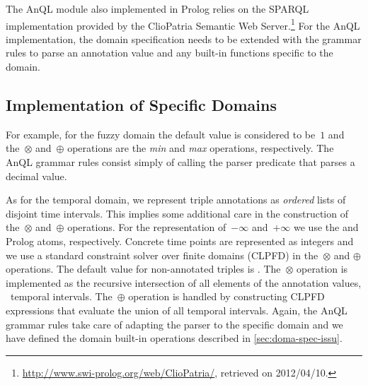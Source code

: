 The AnQL module also implemented in Prolog relies on the SPARQL implementation provided by the ClioPatria Semantic Web
Server.\footnote{\url{http://www.swi-prolog.org/web/ClioPatria/}, retrieved on 2012/04/10.} For the AnQL implementation,
the domain specification needs to be extended with the grammar rules to parse an annotation value and any built-in
functions specific to the domain.


\subsection*{Implementation of Specific Domains}
\label{sec:impl-spec-doma}

For example, for the fuzzy domain the default value is considered to be~$1$ and the~$\otimes$ and~$\oplus$ operations
are the \textit{min} and \textit{max} operations, respectively.  The AnQL grammar rules consist simply of calling the
parser predicate that parses a decimal value.

As for the temporal domain, we represent triple annotations as \emph{ordered} lists of disjoint time intervals.  This
implies some additional care in the construction of the~$\otimes$ and~$\oplus$ operations.  For the representation
of~$-\infty$ and~$+\infty$ we use the  and  Prolog atoms, respectively. Concrete time points are
represented as integers and we use a standard constraint solver over finite domains (CLPFD) in the~$\otimes$ and
$\oplus$ operations. The default value for non-annotated triples is .
%
The~$\otimes$ operation is implemented as the recursive intersection of all elements of the annotation values,
\ie~temporal intervals.  The~$\oplus$ operation is handled by constructing CLPFD expressions that evaluate the union of
all temporal intervals.
%
Again, the AnQL grammar rules take care of adapting the parser to the specific domain and we have defined the domain
built-in operations described in \cref{sec:doma-spec-issu}.



